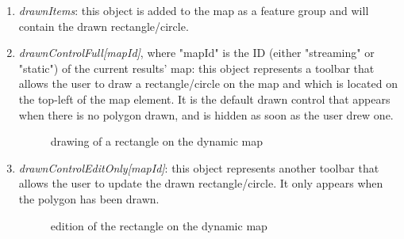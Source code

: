 \documentclass[a4paper,11pt]{report}
\begin{document}
\begin{enumerate}
	\item \emph{drawnItems}: this object is added to the map as a feature group and will contain the drawn rectangle/circle.
	\item \emph{drawnControlFull[mapId]}, where "mapId" is the ID (either "streaming" or "static") of the current results' map: this object represents a toolbar that allows the user to draw a rectangle/circle on the map and which is located on the top-left of the map element. It is the default drawn control that appears when there is no polygon drawn, and is hidden as soon as the user drew one.
	\begin{figure}[H]
	\vspace{-5pt}
	\begin{center}
	\vspace{-5pt}
	\caption{drawing of a rectangle on the dynamic map}
	\end{center}
	\end{figure}
	\vspace{-20pt}
	\newpage
	
	\item \emph{drawnControlEditOnly[mapId]}: this object represents another toolbar that allows the user to update the drawn rectangle/circle. It only appears when the polygon has been drawn.
	\begin{figure}[H]
	\vspace{-5pt}
	\begin{center}
	\vspace{-5pt}
	\caption{edition of the rectangle on the dynamic map}
	\end{center}
	\end{figure}
	\vspace{-20pt}
\end{enumerate}
\end{document}

